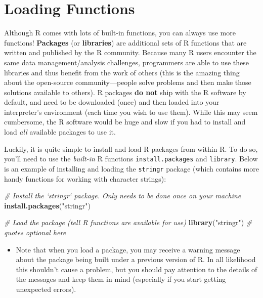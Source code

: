 \documentclass[]{book}
\newenvironment{Shaded}{\begin{snugshade}}{\end{snugshade}}
\newcommand{\KeywordTok}[1]{\textcolor[rgb]{0.13,0.29,0.53}{\textbf{#1}}}
\newcommand{\StringTok}[1]{\textcolor[rgb]{0.31,0.60,0.02}{#1}}
\newcommand{\CommentTok}[1]{\textcolor[rgb]{0.56,0.35,0.01}{\textit{#1}}}
\newcommand{\NormalTok}[1]{#1}
\providecommand{\tightlist}{%
  \setlength{\itemsep}{0pt}\setlength{\parskip}{0pt}}
\theoremstyle{definition}
\theoremstyle{definition}
\theoremstyle{remark}
\begin{document}
\section{Loading Functions}\label{loading-functions}

Although R comes with lots of built-in functions, you can always use
more functions! \textbf{Packages} (or \textbf{libraries}) are additional
sets of R functions that are written and published by the R community.
Because many R users encounter the same data management/analysis
challenges, programmers are able to use these libraries and thus benefit
from the work of others (this is the amazing thing about the open-source
community---people solve problems and then make those solutions
available to others). R packages \textbf{do not} ship with the R
software by default, and need to be downloaded (once) and then loaded
into your interpreter's environment (each time you wish to use them).
While this may seem cumbersome, the R software would be huge and slow if
you had to install and load \emph{all} available packages to use it.

Luckily, it is quite simple to install and load R packages from within
R. To do so, you'll need to use the \emph{built-in} R functions
\texttt{install.packages} and \texttt{library}. Below is an example of
installing and loading the \texttt{stringr} package (which contains more
handy functions for working with character strings):

\begin{Shaded}
\begin{Highlighting}[]
\CommentTok{# Install the `stringr` package. Only needs to be done once on your machine}
\KeywordTok{install.packages}\NormalTok{(}\StringTok{"stringr"}\NormalTok{)}

\CommentTok{# Load the package (tell R functions are available for use)}
\KeywordTok{library}\NormalTok{(}\StringTok{"stringr"}\NormalTok{) }\CommentTok{# quotes optional here}
\end{Highlighting}
\end{Shaded}

\begin{itemize}
\tightlist
\item
  Note that when you load a package, you may receive a warning message
  about the package being built under a previous version of R. In all
  likelihood this shouldn't cause a problem, but you should pay
  attention to the details of the messages and keep them in mind
  (especially if you start getting unexpected errors).
\end{itemize}
\end{document}
